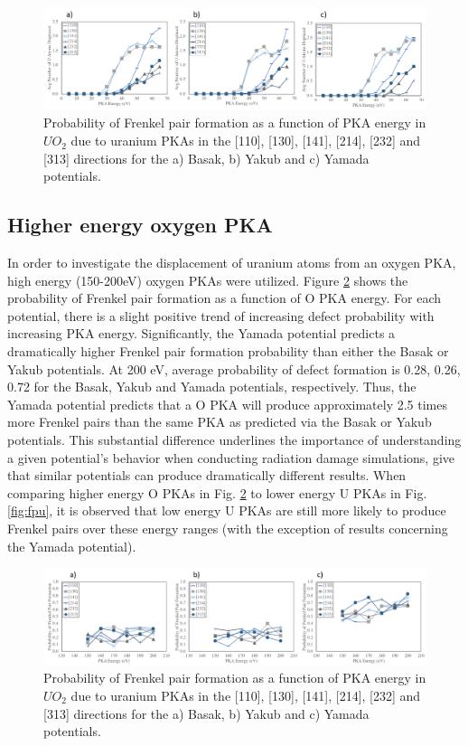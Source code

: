 \documentclass[8pt]{article}   	%
\begin{document}
\begin{figure}[h]
 \centering
 \includegraphics[width=1.0\textwidth]{dispU_U.png} 
 \caption{Probability of Frenkel pair formation as a function of PKA energy in $UO_2$ due to uranium PKAs in the [110], [130], [141], [214], [232] and [313] directions for the a) Basak, b) Yakub and c) Yamada potentials.  }
 \label{fig:dispuu}
\end{figure}

\FloatBarrier

\subsection{Higher energy oxygen PKA}
\hspace{5mm}

In order to investigate the displacement of uranium atoms from an oxygen PKA, high energy (150-200eV) oxygen PKAs were utilized. Figure \ref{fig:fpoe} shows the probability of Frenkel pair formation as a function of O PKA energy. For each potential, there is a slight positive trend of increasing defect probability with increasing PKA energy. Significantly, the Yamada potential predicts a dramatically higher Frenkel pair formation probability than either the Basak or Yakub potentials. At 200 eV, average probability of defect formation is 0.28, 0.26, 0.72 for the Basak, Yakub and Yamada potentials, respectively. Thus, the Yamada potential predicts that a O PKA will produce approximately 2.5 times more Frenkel pairs than the same PKA as predicted via the Basak or Yakub potentials. This substantial difference underlines the importance of understanding a given potential's behavior when conducting radiation damage simulations, give that similar potentials can produce dramatically different results. When comparing higher energy O PKAs in Fig. \ref{fig:fpoe} to lower energy U PKAs in Fig. \ref{fig:fpu}, it is observed that low energy U PKAs are still more likely to produce Frenkel pairs over these energy ranges (with the exception of results concerning the Yamada potential). 

\begin{figure}[h]
 \centering
 \includegraphics[width=1.0\textwidth]{FP_OE.png} 
 \caption{Probability of Frenkel pair formation as a function of PKA energy in $UO_2$ due to uranium PKAs in the [110], [130], [141], [214], [232] and [313] directions for the a) Basak, b) Yakub and c) Yamada potentials.  }
 \label{fig:fpoe}
\end{figure}
\end{document}
